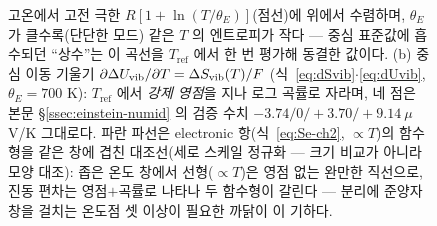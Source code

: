 \begin{figure}[t]
{고온에서 고전 극한 $R[1+\ln(T/\theta_E)]$(점선)에 위에서 수렴하며, $\theta_E$ 가 클수록(단단한 모드)
같은 $T$ 의 엔트로피가 작다 --- 중심 표준값에 흡수되던 ``상수''는 이 곡선을 $T_\mathrm{ref}$ 에서 한 번
평가해 동결한 값이다. (b) 중심 이동 기울기 $\partial\Delta U_{\mathrm{vib}}/\partial T=\Delta S_{\mathrm{vib}}(T)/F$
(식~\eqref{eq:dSvib}$\cdot$\eqref{eq:dUvib}, $\theta_E{=}700$ K): $T_\mathrm{ref}$ 에서 \emph{강제
영점}을 지나 로그 곡률로 자라며, 네 점은 본문 \S\ref{ssec:einstein-numid} 의 검증 수치
$-3.74/0/+3.70/+9.14\ \mu$V/K 그대로다. 파란 파선은 electronic 항(식~\eqref{eq:Se-ch2},
$\propto T$)의 함수형을 같은 창에 겹친 대조선(세로 스케일 정규화 --- 크기 비교가 아니라 모양 대조):
좁은 온도 창에서 선형($\propto T$)은 영점 없는 완만한 직선으로, 진동 편차는 영점$+$곡률로 나타나
두 함수형이 갈린다 --- 분리에 준양자 창을 걸치는 온도점 셋 이상이 필요한 까닭이 이 기하다.}
\label{fig:cand-ff1-6}
\end{figure}
